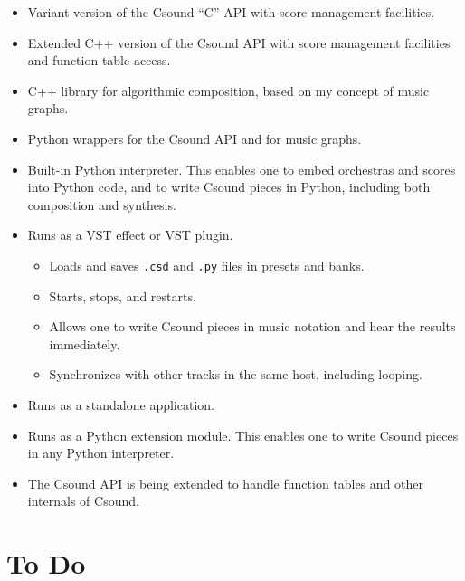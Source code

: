 \documentclass[10pt,letterpaper,onecolumn]{book}
\begin{document}
\begin{itemize}

\item Variant version of the Csound ``C'' API with score management facilities.

\item Extended C++ version of the Csound API with score management facilities and function table access.

\item C++ library for algorithmic composition, based on my concept of music graphs.

\item Python wrappers for the Csound API and for music graphs.

\item Built-in Python interpreter. This enables one to embed orchestras and scores into Python code, and to write Csound pieces in Python, including both composition and synthesis.

\item Runs as a VST effect or VST plugin.

\begin{itemize}

\item Loads and saves \texttt{.csd} and \texttt{.py} files in presets and banks.

\item Starts, stops, and restarts.

\item Allows one to write Csound pieces in music notation and hear the results immediately.

\item Synchronizes with other tracks in the same host, including looping.

\end{itemize}

\item Runs as a standalone application.

\item Runs as a Python extension module. This enables one to write Csound pieces in any Python interpreter.

\item The Csound API is being extended to handle function tables and other internals of Csound.

\end{itemize}

\chapter{To Do}
\end{document}

